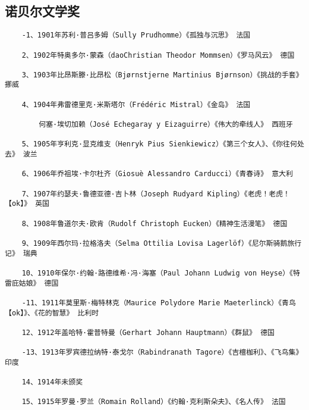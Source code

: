 \documentclass[UTF8]{../RepresentationUniverse}
\begin{document}







\subsection{诺贝尔文学奖}

\begin{lstlisting}
    -1、1901年苏利·普吕多姆（Sully Prudhomme）《孤独与沉思》 法国

    2、1902年特奥多尔·蒙森（daoChristian Theodor Mommsen）《罗马风云》 德国
    
    3、1903年比昂斯滕·比昂松（Bjørnstjerne Martinius Bjørnson）《挑战的手套》 挪威
    
    4、1904年弗雷德里克·米斯塔尔（Frédéric Mistral）《金岛》 法国
    
        何塞·埃切加赖（José Echegaray y Eizaguirre）《伟大的牵线人》 西班牙
    
    5、1905年亨利克·显克维支（Henryk Pius Sienkiewicz）《第三个女人》、《你往何处去》 波兰
    
    6、1906年乔祖埃·卡尔杜齐（Giosuè Alessandro Carducci）《青春诗》 意大利
    
    7、1907年约瑟夫·鲁德亚德·吉卜林（Joseph Rudyard Kipling）《老虎！老虎！【ok】》 英国
    
    8、1908年鲁道尔夫·欧肯（Rudolf Christoph Eucken）《精神生活漫笔》 德国
    
    9、1909年西尔玛·拉格洛夫（Selma Ottilia Lovisa Lagerlöf）《尼尔斯骑鹅旅行记》 瑞典
    
    10、1910年保尔·约翰·路德维希·冯·海塞（Paul Johann Ludwig von Heyse）《特雷庇姑娘》 德国
    
    -11、1911年莫里斯·梅特林克（Maurice Polydore Marie Maeterlinck）《青鸟【ok】》、《花的智慧》 比利时
    
    12、1912年盖哈特·霍普特曼（Gerhart Johann Hauptmann）《群鼠》 德国
    
    -13、1913年罗宾德拉纳特·泰戈尔（Rabindranath Tagore）《吉檀枷利》、《飞鸟集》 印度
    
    14、1914年未颁奖
    
    15、1915年罗曼·罗兰（Romain Rolland）《约翰·克利斯朵夫》、《名人传》 法国
    

\end{lstlisting}
\end{document}

